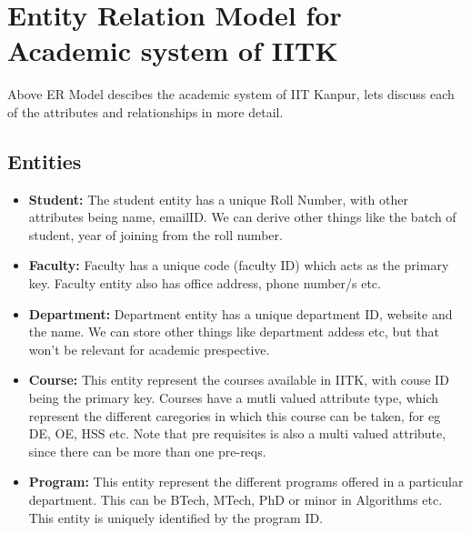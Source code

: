 \documentclass[a4paper]{article}
\begin{document}

\section*{Entity Relation Model for Academic system of IITK}
Above ER Model descibes the academic system of IIT Kanpur, lets discuss each of the attributes and relationships in more detail.

\subsection*{Entities}
\begin{itemize}
	\item{\textbf{Student:}} The student entity has a unique Roll Number, with other attributes being name, emailID.
	We can derive other things like the batch of student, year of joining from the roll number.
	\item{\textbf{Faculty:}} Faculty has a unique code (faculty ID) which acts as the primary key.
	Faculty entity also has office address, phone number/s etc.
	\item{\textbf{Department:}} Department entity has a unique department ID, website and the name.
	We can store other things like department addess etc, but that won't be relevant for academic prespective.
	\item{\textbf{Course:}} This entity represent the courses available in IITK, with couse ID being the primary key.
	Courses have a mutli valued attribute type, which represent the different caregories in which
	this course can be taken, for eg DE, OE, HSS etc. Note that pre requisites is also a multi valued attribute,
	since there can be more  than one pre-reqs.
	\item{\textbf{Program:}} This entity represent the different programs offered in a particular department.
	This can be BTech, MTech, PhD or minor in Algorithms etc. This entity is uniquely identified by the program ID.
\end{itemize}
\end{document}
